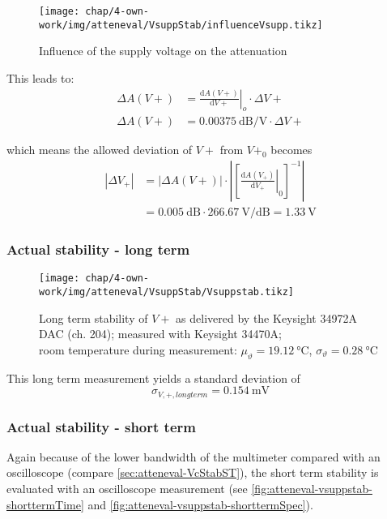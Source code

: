 \begin{figure}[tb]
	\centering
	\texttt{[image: chap/4-own-work/img/atteneval/VsuppStab/influenceVsupp.tikz]}
	\caption{Influence of the supply voltage on the attenuation}
	\label{fig:atteneval-vsupp-influence}
\end{figure}

This leads to:
\begin{align}
\Delta A(V+) &= \left.\frac{\text{d}A(V+)}{\text{d}V+}\right|_{o} \cdot \Delta V+ \\
\Delta A(V+) &= \SI{0.00375}{\dB\per\volt} \cdot \Delta V+
\end{align}

which means the allowed deviation of $V+$ from $V+_0$ becomes
\begin{align}\label{eq:atteneval-stabVsupp}
\left|\Delta V_{+}\right| &= \left|\Delta A(V+)\right| \cdot 
\left|\left[\left.\frac{\text{d}A(V_{+})}{\text{d}V_{+}}\right|_{0}\right]^{-1}\right| \\
 &= \SI{0.005}{\dB} \cdot \SI{266.67}{\volt\per\dB} = \SI{1.33}{\volt}
\end{align}

\FloatBarrier
\subsubsection{Actual stability - long term}

\begin{figure}[tb]
	\centering
	\texttt{[image: chap/4-own-work/img/atteneval/VsuppStab/Vsuppstab.tikz]}
	\caption{Long term stability of $V+$ as delivered by the Keysight 34972A DAC (ch. 204); measured with Keysight 34470A;\\room temperature during measurement: $\mu_\vartheta=\SI{19.12}{\degreeCelsius}$, $\sigma_\vartheta=\SI{0.28}{\degreeCelsius}$}
	\label{fig:atteneval-vsupplstab-longterm}
\end{figure}

This long term measurement yields a standard deviation of
\begin{equation}
\sigma_{V,+,longterm} = \SI{0.154}{\milli\volt}
\end{equation}

\FloatBarrier
\subsubsection{Actual stability - short term}
Again because of the lower bandwidth of the multimeter compared with an oscilloscope (compare \autoref{sec:atteneval-VcStabST}), the short term stability is evaluated with an oscilloscope measurement (see \autoref{fig:atteneval-vsuppstab-shorttermTime} and \autoref{fig:atteneval-vsuppstab-shorttermSpec}).

